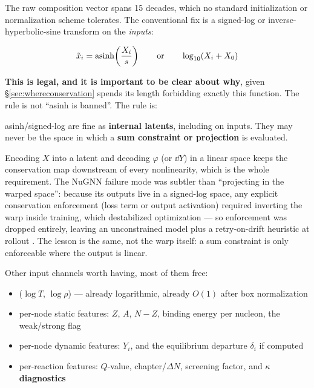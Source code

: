 The raw composition vector spans 15 decades, which no standard initialization or
normalization scheme tolerates. The conventional fix is a signed-log or
inverse-hyperbolic-sine transform on the \emph{inputs}:

\begin{equation*}
\tilde{x}_i = \operatorname{asinh}\!\left(\frac{X_i}{s}\right) \qquad \text{or} \qquad
\log_{10}(X_i + X_0)
\end{equation*}

\textbf{This is legal, and it is important to be clear about why}, given
\S\ref{sec:whereconservation} spends its length forbidding exactly this
function. The rule is not ``asinh is banned''. The rule is:

\begin{invariant}
asinh/signed-log are fine as \textbf{internal latents}, including on inputs.
They may never be the space in which a \textbf{sum constraint or projection} is
evaluated.
\end{invariant}

Encoding $X$ into a latent and decoding $\varphi$ (or $\dd Y$) in a linear space
keeps the conservation map downstream of every nonlinearity, which is the whole
requirement. The NuGNN failure mode was subtler than ``projecting in the warped
space'': because its outputs live in a signed-log space, any explicit
conservation enforcement (loss term or output activation) required inverting the
warp inside training, which destabilized optimization --- so enforcement was
dropped entirely, leaving an unconstrained model plus a retry-on-drift heuristic
at rollout \citep{kim2026}. The lesson is the same, not the warp itself: a sum
constraint is only enforceable where the output is linear.

Other input channels worth having, most of them free:

\begin{itemize}
\item ($\log T$, $\log\rho$) --- already logarithmic, already $O(1)$ after box
      normalization
\item per-node static features: $Z$, $A$, $N-Z$, binding energy per nucleon, the
      weak/strong flag
\item per-node dynamic features: $Y_i$, and the equilibrium departure $\delta_i$
      if computed
\item per-reaction features: $Q$-value, chapter/$\Delta N$, screening factor,
      and \textbf{$\kappa$ diagnostics}
\end{itemize}

